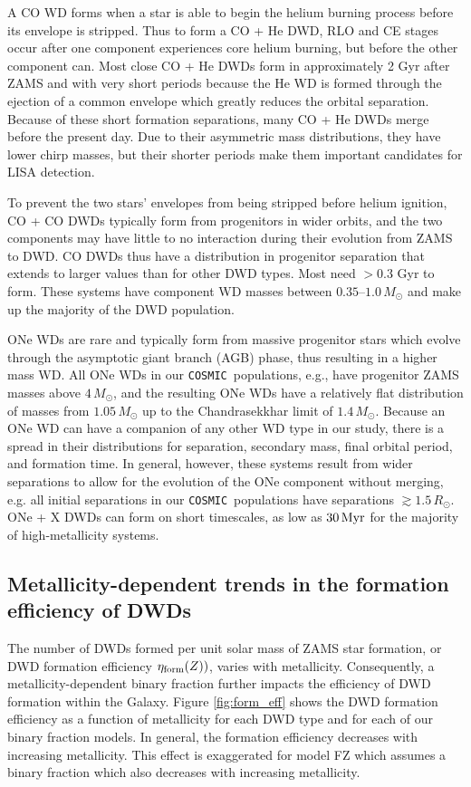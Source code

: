 \documentclass[twocolumn, linenumbers]{aastex631}
\newcommand{\cosmic}{\texttt{COSMIC}}
\begin{document}
A CO WD forms when a star is able to begin the helium burning process before its envelope is stripped. Thus to form a CO + He DWD, RLO and CE stages occur after one component experiences core helium burning, but before the other component can. Most close CO + He DWDs form in approximately 2 Gyr after ZAMS and with very short periods because the He WD is formed through the ejection of a common envelope which greatly reduces the orbital separation. Because of these short formation separations, many CO + He DWDs merge before the present day. Due to their asymmetric mass distributions, they have lower chirp masses, but their shorter periods make them important candidates for LISA detection. 

To prevent the two stars' envelopes from being stripped before helium ignition, CO + CO DWDs typically form from progenitors in wider orbits, and the two components may have little to no interaction during their evolution from ZAMS to DWD. CO DWDs thus have a distribution in progenitor separation that extends to larger values than for other DWD types. Most need $> 0.3$ Gyr to form. These systems have component WD masses between $0.35$--$1.0\,M_\odot$ and make up the majority of the DWD population. 


ONe WDs are rare and typically form from massive progenitor stars which evolve through the asymptotic giant branch (AGB) phase, thus resulting in a higher mass WD. All ONe WDs in our \cosmic\ populations, e.g., have progenitor ZAMS masses above $4\,M_\odot$, and the resulting ONe WDs have a relatively flat distribution of masses from $1.05\,M_\odot$ up to the Chandrasekkhar limit of $1.4\,M_\odot$. Because an ONe WD can have a companion of any other WD type in our study, there is a spread in their distributions for separation, secondary mass, final orbital period, and formation time. In general, however, these systems result from wider separations to allow for the evolution of the ONe component without merging, e.g. all initial separations in our \cosmic \ populations have separations $\gtrsim 1.5\,R_\odot$. ONe + X DWDs can form on short timescales, as low as $30\,\rm{Myr}$ for the majority of high-metallicity systems. 



\subsection{Metallicity-dependent trends in the formation efficiency of DWDs}\label{sec:formeff}
The number of DWDs formed per unit solar mass of ZAMS star formation, or DWD formation efficiency $\eta_{\rm{form}}(Z))$, varies with metallicity. Consequently, a metallicity-dependent binary fraction further impacts the efficiency of DWD formation within the Galaxy. Figure \ref{fig:form_eff} shows the DWD formation efficiency as a function of metallicity for each DWD type and for each of our binary fraction models. In general, the formation efficiency decreases with increasing metallicity. This effect is exaggerated for model FZ which assumes a binary fraction which also decreases with increasing metallicity. 
\end{document}
